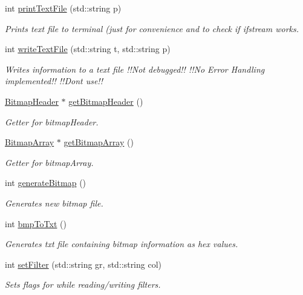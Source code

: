 \begin{DoxyCompactItemize}
int \mbox{\hyperlink{classImage_ae5daf791502caefeae1b15360d354513}{print\+Text\+File}} (std\+::string p)
\begin{DoxyCompactList}\small\item\em Prints text file to terminal (just for convenience and to check if ifstream works. \end{DoxyCompactList}\item 
int \mbox{\hyperlink{classImage_a2dc30c9d6280b8c0edd2f4f0ab474a5c}{write\+Text\+File}} (std\+::string t, std\+::string p)
\begin{DoxyCompactList}\small\item\em Writes information to a text file !!\+Not debugged!! !!\+No Error Handling implemented!! !!\+Dont use!! \end{DoxyCompactList}\item 
\mbox{\hyperlink{classBitmapHeader}{Bitmap\+Header}} $\ast$ \mbox{\hyperlink{classImage_a8c824ffac0c866a94752a2c1047932af}{get\+Bitmap\+Header}} ()
\begin{DoxyCompactList}\small\item\em Getter for bitmap\+Header. \end{DoxyCompactList}\item 
\mbox{\hyperlink{classBitmapArray}{Bitmap\+Array}} $\ast$ \mbox{\hyperlink{classImage_a75b5051c6cc39a5e3f86d287f5cc7f9c}{get\+Bitmap\+Array}} ()
\begin{DoxyCompactList}\small\item\em Getter for bitmap\+Array. \end{DoxyCompactList}\item 
int \mbox{\hyperlink{classImage_a3ca1ae6c1eb2846bfba066b01e6020e1}{generate\+Bitmap}} ()
\begin{DoxyCompactList}\small\item\em Generates new bitmap file. \end{DoxyCompactList}\item 
int \mbox{\hyperlink{classImage_aa16c9acd068079c676dec4186262b1b7}{bmp\+To\+Txt}} ()
\begin{DoxyCompactList}\small\item\em Generates txt file containing bitmap information as hex values. \end{DoxyCompactList}\item 
int \mbox{\hyperlink{classImage_ac81078a3d6c364aada9afc3c8a668ef8}{set\+Filter}} (std\+::string gr, std\+::string col)
\begin{DoxyCompactList}\small\item\em Sets flags for while reading/writing filters. \end{DoxyCompactList}\end{DoxyCompactItemize}
